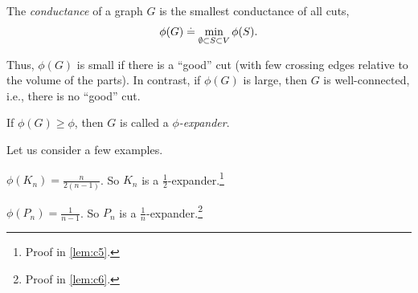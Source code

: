 \begin{defn}The \emph{conductance} of a graph $G$ is the smallest conductance of all cuts, \begin{align}
    \phi(G) \overset{.}{=} \min_{\emptyset \subset S \subset V} \phi(S).
\end{align}
\end{defn} Thus, $\phi(G)$ is small if there is a ``good'' cut (with few crossing edges relative to the volume of the parts). In contrast, if $\phi(G)$ is large, then $G$ is well-connected, i.e., there is no ``good'' cut.

\begin{defn}[Expander] If $\phi(G) \geq \phi$, then $G$ is called a \emph{$\phi$-expander}.
\end{defn}

Let us consider a few examples.

\begin{lem}
$\phi(K_n) = \frac{n}{2(n-1)}$. So $K_n$ is a $\frac{1}{2}$-expander.\footnote{Proof in \cref{lem:c5}.}
\end{lem}

\begin{lem}
$\phi(P_n) = \frac{1}{n-1}$. So $P_n$ is a $\frac{1}{n}$-expander.\footnote{Proof in \cref{lem:c6}.}
\end{lem}

